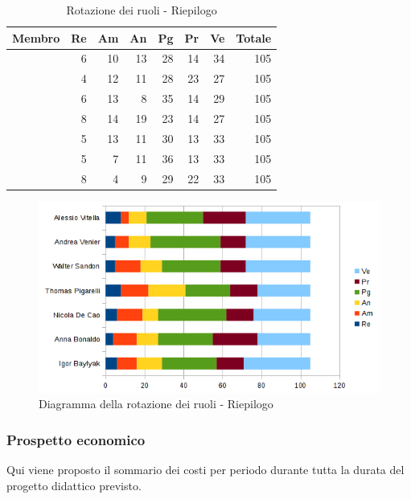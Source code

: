 \documentclass[12pt,a4paper]{article}
\begin{document}
\begin{table}[H]
	\begin{center}
		\begin{tabular}{l r r r r r r r}
			\toprule
			\textbf{Membro}	&	\textbf{Re}	&	\textbf{Am}	& \textbf{An} & \textbf{Pg} & \textbf{Pr} & \textbf{Ve} & \textbf{Totale}\\
			\midrule
			\midrule
			\IB{} & 6 & 10 & 13 & 28 & 14 & 34 & 105 \\
			\midrule
			\AB{} & 4 & 12 & 11 & 28 & 23 & 27 & 105 \\
			\midrule
			\NDC{} & 6 & 13 & 8 & 35 & 14 & 29 & 105 \\
			\midrule
			\TP{} & 8 & 14 & 19 & 23 & 14 & 27 & 105 \\
			\midrule
			\WS{} & 5 & 13 & 11 & 30 & 13 & 33 & 105 \\
			\midrule
			\AVE{} & 5 & 7 & 11 & 36 & 13 & 33 & 105 \\
			\midrule
			\AVI{} & 8 & 4 & 9 & 29 & 22 & 33 & 105 \\
			\bottomrule
		\end{tabular}
		\caption{Rotazione dei ruoli - Riepilogo}
	\end{center}
\end{table}

\begin{center}
	\begin{figure}[H]
		\centering \includegraphics[width=\textwidth]{../img/diagrammaBarreRiepilogoRotazioneRuoli.png}
		\caption{Diagramma della rotazione dei ruoli - Riepilogo}
	\end{figure}
\end{center}

\newpage
\subsubsection{Prospetto economico}
Qui viene proposto il sommario dei costi per periodo durante tutta la durata del progetto didattico previsto.
\end{document}
